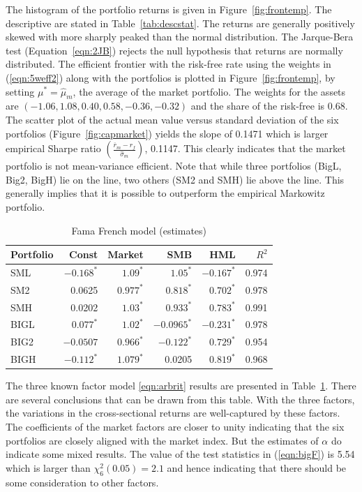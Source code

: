 The histogram of the portfolio returns is given in Figure~\ref{fig:frontemp}. The descriptive are stated in Table~\ref{tab:descstat}. The returns are generally positively skewed with more sharply peaked than the normal distribution. The Jarque-Bera test (Equation~\ref{eqn:2JB}) rejects the null hypothesis that returns are normally distributed. The efficient frontier with the risk-free rate using the weights in (\ref{eqn:5weff2}) along with the portfolios is plotted in Figure~\ref{fig:frontemp}, by setting $\mu^*=\hat{\mu}_m$, the average of the market portfolio. The weights for the assets are $(-1.06,1.08,0.40,0.58,-0.36,-0.32)$ and the share of the risk-free is 0.68. The scatter plot of the actual mean value versus standard deviation of the six portfolios (Figure~\ref{fig:capmarket}) yields the slope of 0.1471 which is larger empirical Sharpe ratio $\left(\frac{\overline{r}_m - r_f}{\hat{\sigma}_m}\right)$, 0.1147. This clearly indicates that the market portfolio is not mean-variance efficient. Note that while three portfolios (BigL, Big2, BigH) lie on the line, two others (SM2 and SMH) lie above the line. This generally implies that it is possible to outperform the empirical Markowitz portfolio. 


\begin{table}
\centering
\caption{Fama French model (estimates)\label{tab:famafrenchmodel}}
\begin{tabular}{lrrrrr}
Portfolio & Const & Market & SMB & HML & $R^2$ \\ \hline
SML & $-0.168^*$ & $1.09^*$ & $1.05^*$ & $-0.167^*$ & 0.974 \\
SM2 & 0.0625 & $0.977^*$ & $0.818^*$ & $0.702^*$ & 0.978 \\
SMH & 0.0202 & $1.03^*$ & $0.933^*$ & $0.783^*$ & 0.991 \\
BIGL & $0.077^*$ & $1.02^*$ & $-0.0965^*$ & $-0.231^*$ & 0.978 \\
BIG2 & $-0.0507$ & $0.966^*$ & $-0.122^*$ & $0.729^*$ & 0.954 \\
BIGH & $-0.112^*$ & $1.079^*$ & 0.0205 & $0.819^*$ & 0.968
\end{tabular}
\end{table}


The three known factor model \eqref{eqn:arbrit} results are presented in Table~\ref{tab:famafrenchmodel}. There are several conclusions that can be drawn from this table. With the three factors, the variations in the cross-sectional returns are well-captured by these factors. The coefficients of the market factors are closer to unity indicating that the six portfolios are closely aligned with the market index. But the estimates of $\alpha$ do indicate some mixed results. The value of the test statistics in (\ref{eqn:bigF}) is 5.54 which is larger than $\chi_6^2(0.05)=2.1$ and hence indicating that there should be some consideration to other factors.


